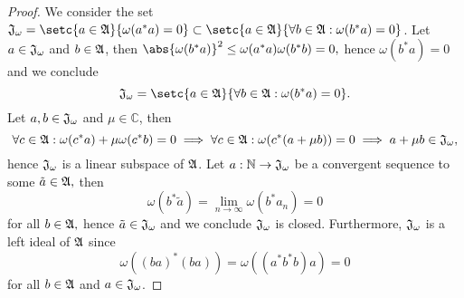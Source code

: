 \begin{proof}
    We consider the set \(\algebra{J}_\omega = \setc{a \in \algebra{A}}{\omega(a^*a) = 0} \subset \setc{a \in \algebra{A}}{\forall b \in \algebra{A} : \omega(b^*a) = 0}\). Let \(a \in \mathfrak{J}_\omega\) and \(b \in \mathfrak{A}\), then \(\abs{\omega(b^*a)}^2 \leq \omega(a^*a) \omega(b^*b) = 0,\) hence \(\omega(b^*a) = 0\) and we conclude
    \begin{equation*}
        \algebra{J}_\omega = \setc{a \in \algebra{A}}{\forall b \in \algebra{A} : \omega(b^*a) = 0}.
    \end{equation*}
    Let \(a, b \in \mathfrak{J}_\omega\) and \(\mu \in \mathbb{C}\), then
    \begin{equation*}
        \forall c \in \mathfrak{A} : \omega(c^*a) + \mu \omega(c^*b) = 0 \implies \forall c \in \mathfrak{A} : \omega(c^*(a + \mu b)) = 0 \implies a + \mu b \in \mathfrak{J}_\omega,
    \end{equation*}
    hence \(\mathfrak{J}_\omega\) is a linear subspace of \(\mathfrak{A}\). Let \(a : \mathbb{N} \to \mathfrak{J}_\omega\) be a convergent sequence to some \(\tilde{a} \in \mathfrak{A},\) then
    \begin{equation*}
        \omega(b^*\tilde{a}) = \lim_{n \to \infty}{\omega(b^*a_n)} = 0
    \end{equation*}
    for all \(b \in \mathfrak{A},\) hence \(\tilde{a} \in \mathfrak{J}_\omega\) and we conclude \(\mathfrak{J}_\omega\) is closed. Furthermore, \(\mathfrak{J}_\omega\) is a left ideal of \(\mathfrak{A}\) since 
    \begin{equation*}
        \omega((ba)^*(ba)) = \omega((a^*b^*b)a) = 0
    \end{equation*}
    for all \(b \in \mathfrak{A}\) and \(a \in \mathfrak{J}_\omega\). 


\end{proof}
